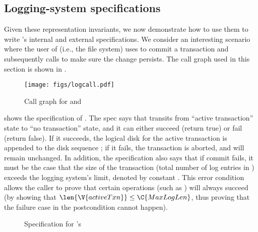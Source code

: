 \subsection{Logging-system specifications}

Given these representation invariants, we now demonstrate how to use them
to write \syslog's internal and external specifications.  We consider an
interesting scenario where the user of \syslog (i.e., the file system) uses
 to commit a transaction and subsequently calls
 to make sure the change persists.  The call graph used
in this section is shown in .

\begin{figure}[htb]
  \centering
  \texttt{[image: figs/logcall.pdf]}
  \caption{Call graph for  and }
  \label{fig:log-call}
\end{figure}

 shows the specification of .
The spec says that  transits from ``active transaction''
state to ``no transaction'' state, and it can either succeed (return true)
or fail (return false).  If it succeeds, the logical disk for the active
transaction  is appended to the disk sequence ;
if it fails, the transaction is aborted, and  will remain
unchanged.  In addition, the specification also says that if commit fails,
it must be the case that the size of the transaction (total number of log
entries in ) exceeds the logging system's limit, denoted by
constant .  This error condition allows the caller to prove
that certain operations (such as ) will always succeed (by
showing that $\len{\V{activeTxn}} \le \C{MaxLogLen}$, thus proving
that the failure case in the postcondition cannot happen).

\begin{figure}[htb]
\begin{spec}
\end{spec}
\caption{Specification for \logapi's }
\label{fig:spec_log_commit}
\end{figure}

